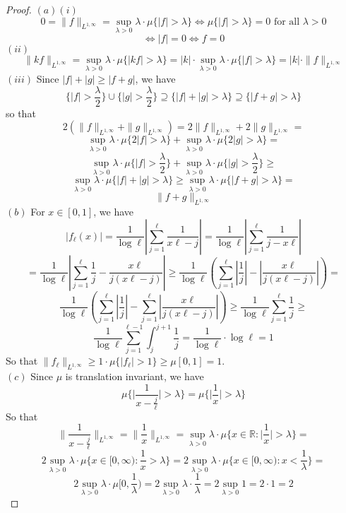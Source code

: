 \documentclass[12pt]{article}
\begin{document}
\begin{proof}
  $(a) (i)$
  $$0 = \|f\|_{L^{1, \infty}} = \sup_{\lambda > 0} \lambda \cdot \mu \{|f| > \lambda\} \iff \mu \{|f| > \lambda\} = 0 \text{ for all } \lambda > 0$$ $$\iff |f| = 0 \iff f = 0$$
  $(ii)$
  $$\|kf\|_{L^{1, \infty}} = \sup_{\lambda > 0} \lambda \cdot \mu \{|kf| > \lambda\} = |k| \cdot \sup_{\lambda > 0} \lambda \cdot \mu \{|f| > \lambda\} = |k| \cdot \|f\|_{L^{1, \infty}}$$
  $(iii)$ Since $|f| + |g| \ge |f + g|$, we have
  $$\{|f| > \dfrac{\lambda}{2}\} \cup \{|g| > \dfrac{\lambda}{2}\} \supseteq \{|f| + |g| > \lambda\} \supseteq \{|f+g| > \lambda\}$$
  so that
  $$2(\|f\|_{L^{1, \infty}} + \|g\|_{L^{1, \infty}}) = 2\|f\|_{L^{1, \infty}} + 2\|g\|_{L^{1, \infty}} =$$
  $$\sup_{\lambda > 0} \lambda \cdot \mu \{2|f| > \lambda\} + \sup_{\lambda > 0} \lambda \cdot \mu \{2|g| > \lambda\} = $$
  $$\sup_{\lambda > 0} \lambda \cdot \mu \{|f| > \dfrac{\lambda}{2}\} + \sup_{\lambda > 0} \lambda \cdot \mu \{|g| > \dfrac{\lambda}{2}\} \ge$$
  $$\sup_{\lambda > 0} \lambda \cdot \mu \{|f| + |g| > \lambda\} \ge \sup_{\lambda > 0} \lambda \cdot \mu \{|f + g| > \lambda\} =$$
  $$\|f + g\|_{L^{1, \infty}}$$
  $(b)$ For $x \in [0, 1]$, we  have
  $$|f_\ell(x)| = \dfrac{1}{\log \ell} |\sum_{j=1}^\ell \dfrac{1}{x \ell - j}| = \dfrac{1}{\log \ell} |\sum_{j=1}^\ell \dfrac{1}{j - x \ell}|$$
  $$= \dfrac{1}{\log \ell} |\sum_{j=1}^\ell \dfrac{1}{j} - \dfrac{x \ell}{j(x \ell - j)}| \ge \dfrac{1}{\log \ell}(\sum_{j=1}^\ell |\dfrac{1}{j}| - |\dfrac{x \ell}{j(x \ell - j)}|) =$$
  $$\dfrac{1}{\log \ell}(\sum_{j=1}^\ell |\dfrac{1}{j}| - \sum_{j=1}^\ell|\dfrac{x \ell}{j(x \ell - j)}|) \ge \dfrac{1}{\log \ell} \sum_{j=1}^\ell \dfrac{1}{j} \ge$$
  $$\dfrac{1}{\log \ell} \sum_{j=1}^{\ell - 1} \int_{j}^{j+1}\dfrac{1}{j} = \dfrac{1}{\log \ell} \cdot \log  \ell = 1$$
  So that $\|f_\ell \|_{L^{1, \infty}} \ge 1 \cdot \mu\{|f_\ell| > 1\} \ge \mu[0, 1] = 1$.\\
  $(c)$ Since $\mu$ is translation invariant, we have
  $$\mu \Bigg\{\Bigg | \dfrac{1}{x - \frac{j}{\ell}} \Bigg | > \lambda \Bigg\} = \mu \Bigg\{\Bigg |\dfrac{1}{x} \Bigg | > \lambda \Bigg\}$$
  So that
  $$\Bigg \|\dfrac{1}{x - \frac{j}{\ell}} \Bigg\|_{L^{1, \infty}} = \Bigg \|\dfrac{1}{x} \Bigg\|_{L^{1, \infty}} = \sup_{\lambda > 0} \lambda \cdot \mu \Big \{x \in \mathbb{R}: \Big| \frac{1}{x} \Big | > \lambda \Big \} =$$
  $$2 \sup_{\lambda > 0} \lambda \cdot \mu \Big \{x \in [0, \infty): \frac{1}{x} > \lambda \Big \} = 2 \sup_{\lambda > 0} \lambda \cdot \mu \Big \{x \in [0, \infty): x < \frac{1}{\lambda} \Big \} =$$
  $$2 \sup_{\lambda > 0} \lambda \cdot \mu[0, \frac{1}{\lambda}) = 2 \sup_{\lambda > 0} \lambda \cdot \frac{1}{\lambda} = 2 \sup_{\lambda > 0} 1  = 2  \cdot 1 = 2$$

\end{proof}
\end{document}
